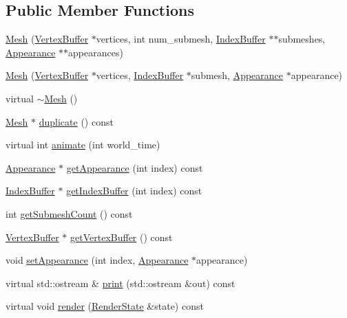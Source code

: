 \subsection*{Public Member Functions}
\begin{CompactItemize}
\item 
\hyperlink{classm3g_1_1Mesh_f2c80c243fdcd32b07c77d2ab3d565ab}{Mesh} (\hyperlink{classm3g_1_1VertexBuffer}{VertexBuffer} $\ast$vertices, int num\_\-submesh, \hyperlink{classm3g_1_1IndexBuffer}{IndexBuffer} $\ast$$\ast$submeshes, \hyperlink{classm3g_1_1Appearance}{Appearance} $\ast$$\ast$appearances)
\item 
\hyperlink{classm3g_1_1Mesh_2d7766ebbb63eccd77d0dd8b53b400a3}{Mesh} (\hyperlink{classm3g_1_1VertexBuffer}{VertexBuffer} $\ast$vertices, \hyperlink{classm3g_1_1IndexBuffer}{IndexBuffer} $\ast$submesh, \hyperlink{classm3g_1_1Appearance}{Appearance} $\ast$appearance)
\item 
virtual \hyperlink{classm3g_1_1Mesh_6e26384cfb03023e7dc2e5419baf813f}{$\sim$Mesh} ()
\item 
\hyperlink{classm3g_1_1Mesh}{Mesh} $\ast$ \hyperlink{classm3g_1_1Mesh_52ce6d0b3eda2bd3a95bfb5b7dbb6f82}{duplicate} () const 
\item 
virtual int \hyperlink{classm3g_1_1Mesh_8aad1ceab4c2a03609c8a42324ce484d}{animate} (int world\_\-time)
\item 
\hyperlink{classm3g_1_1Appearance}{Appearance} $\ast$ \hyperlink{classm3g_1_1Mesh_4950a19e02c022dcf41a086117eb8219}{getAppearance} (int index) const 
\item 
\hyperlink{classm3g_1_1IndexBuffer}{IndexBuffer} $\ast$ \hyperlink{classm3g_1_1Mesh_ca34a663f46ce20e2b894c046714ea1d}{getIndexBuffer} (int index) const 
\item 
int \hyperlink{classm3g_1_1Mesh_5dc5a57ad549eb97504c2a1280a882dd}{getSubmeshCount} () const 
\item 
\hyperlink{classm3g_1_1VertexBuffer}{VertexBuffer} $\ast$ \hyperlink{classm3g_1_1Mesh_7602e9bf450fa8b3ec3c60e2e88cba25}{getVertexBuffer} () const 
\item 
void \hyperlink{classm3g_1_1Mesh_bb03b872c453c4f8f3fe31e8b54d1b52}{setAppearance} (int index, \hyperlink{classm3g_1_1Appearance}{Appearance} $\ast$appearance)
\item 
virtual std::ostream \& \hyperlink{classm3g_1_1Mesh_6fea17fa1532df3794f8cb39cb4f911f}{print} (std::ostream \&out) const 
\item 
virtual void \hyperlink{classm3g_1_1Mesh_8babc8a79b78615da51161e94029eea9}{render} (\hyperlink{structm3g_1_1RenderState}{RenderState} \&state) const 
\end{CompactItemize}
